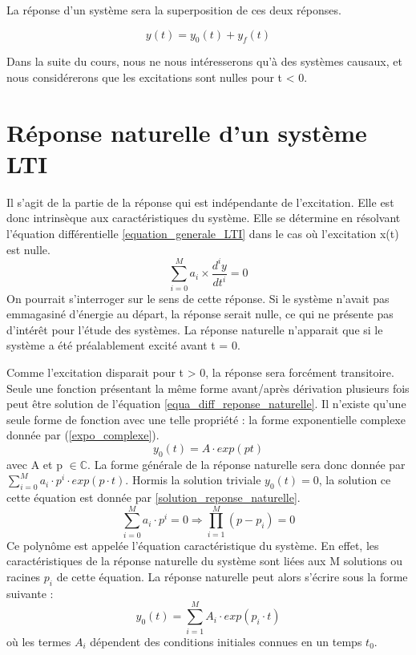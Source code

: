 	La réponse d'un système sera la superposition de ces deux réponses.
	
	\begin{equation}
	y(t) = y_{0}(t)+y_{f}(t)
	\end{equation}
	
	Dans la suite du cours, nous ne nous intéresserons qu'à des systèmes causaux,  et nous considérerons que les excitations sont nulles pour t < 0.
	
	\section{Réponse naturelle d'un système LTI}
	Il s'agit de la partie de la réponse qui est indépendante de l'excitation. Elle est donc intrinsèque aux caractéristiques du système. Elle se détermine en résolvant l'équation différentielle \ref{equation_generale_LTI} dans le cas où l'excitation x(t) est nulle.
	\begin{equation}\label{equa_diff_reponse_naturelle}
	\sum_{i=0}^M a_{i}\times \frac{d^{i}y}{dt^{i}} = 0
	\end{equation}
	On pourrait s'interroger sur le sens de cette réponse. Si le système n'avait pas emmagasiné d'énergie au départ, la réponse serait nulle, ce qui ne présente pas d'intérêt pour l'étude des systèmes. La réponse naturelle n'apparait que si le système a été préalablement excité avant t = 0.  
	
	Comme l'excitation disparait pour t > 0, la réponse sera forcément transitoire. Seule une fonction présentant la même forme avant/après dérivation plusieurs fois peut être solution de l'équation \ref{equa_diff_reponse_naturelle}. Il n'existe qu'une seule forme de fonction avec une telle propriété : la forme exponentielle complexe donnée par (\ref{expo_complexe}).
	\begin{equation}\label{expo_complexe}
	y_{0}(t) = A \cdot exp(p t)       
	\end{equation}
	avec A et p $\in \mathbb{C}$. La forme générale de la réponse naturelle sera donc donnée par $ \sum_{i=0}^M a_{i}\cdot p^{i} \cdot exp(p \cdot t) $. Hormis la solution triviale $y_{0}(t) = 0$, la solution ce cette équation est donnée par \ref{solution_reponse_naturelle}.
	\begin{equation} \label{solution_reponse_naturelle}
	\sum_{i=0}^M a_{i}\cdot p^{i} = 0 \Rightarrow \prod_{i=1}^{M} (p-p_{i}) = 0     
	\end{equation}	
	Ce polynôme est appelée l'équation caractéristique du système. En effet, les caractéristiques de la réponse naturelle du système sont liées aux M solutions ou racines $p_{i}$ de cette équation. La réponse naturelle peut alors s'écrire sous la forme suivante :
	\begin{equation}\label{reponse_naturelle}
	y_{0}(t) = \sum_{i=1}^M A_{i}\cdot exp(p_{i} \cdot t) 
	\end{equation}
	où les termes $A_{i}$ dépendent des conditions initiales connues en un temps $ t_{0}$.
	
